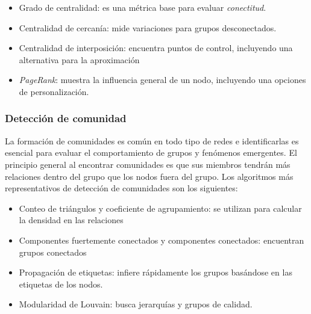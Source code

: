 \documentclass[11pt,letterpaper,oneside]{article}
\begin{document}
	\begin{itemize}
		\item Grado de centralidad: es una métrica base para evaluar {\em conectitud}.
		\item Centralidad de cercanía: mide variaciones para grupos desconectados.
		\item Centralidad de interposición: encuentra puntos de control, incluyendo una alternativa para la aproximación
		\item \textit{PageRank}: muestra la influencia general de un nodo, incluyendo una opciones de personalización.
	\end{itemize}

	\subsubsection{Detección de comunidad}
	La formación de comunidades es común en todo tipo de redes e identificarlas es esencial para evaluar el comportamiento de grupos y fenómenos emergentes. El principio general al encontrar comunidades es que sus miembros tendrán más relaciones dentro del grupo que los nodos fuera del grupo. Los algoritmos más representativos de detección de comunidades son los siguientes:
	
	\begin{itemize}
		\item Conteo de triángulos y coeficiente de agrupamiento: se utilizan para calcular la densidad en las relaciones
		\item Componentes fuertemente conectados y componentes conectados: encuentran grupos conectados
		\item Propagación de etiquetas: infiere rápidamente los grupos basándose en las etiquetas de los nodos.
		\item Modularidad de Louvain: busca jerarquías y grupos de calidad.
	\end{itemize}
	
	\newpage
\end{document}
